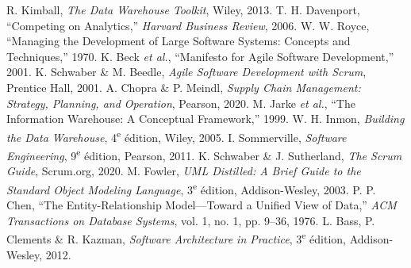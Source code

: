 \documentclass[12pt,a4paper]{report}
\begin{document}
\cleardoublepage
\begin{thebibliography}{99}
    R. Kimball, \textit{The Data Warehouse Toolkit}, Wiley, 2013.  
    T. H. Davenport, “Competing on Analytics,” \textit{Harvard Business Review}, 2006.  
    W. W. Royce, “Managing the Development of Large Software Systems: Concepts and Techniques,” 1970.  
    K. Beck \emph{et al.}, “Manifesto for Agile Software Development,” 2001.  
    K. Schwaber \& M. Beedle, \textit{Agile Software Development with Scrum}, Prentice Hall, 2001.  
    A. Chopra \& P. Meindl, \textit{Supply Chain Management: Strategy, Planning, and Operation}, Pearson, 2020.  
    M. Jarke \emph{et al.}, “The Information Warehouse: A Conceptual Framework,” 1999.  
    W. H. Inmon, \textit{Building the Data Warehouse}, 4\textsuperscript{e} édition, Wiley, 2005.  
    I. Sommerville, \textit{Software Engineering}, 9\textsuperscript{e} édition, Pearson, 2011.
    K. Schwaber \& J. Sutherland, \textit{The Scrum Guide}, Scrum.org, 2020.
    M. Fowler, \textit{UML Distilled: A Brief Guide to the Standard Object Modeling Language}, 3\textsuperscript{e} édition, Addison-Wesley, 2003.
    P. P. Chen, “The Entity-Relationship Model—Toward a Unified View of Data,” \textit{ACM Transactions on Database Systems}, vol. 1, no. 1, pp. 9–36, 1976.
    L. Bass, P. Clements \& R. Kazman, \textit{Software Architecture in Practice}, 3\textsuperscript{e} édition, Addison-Wesley, 2012.
\end{thebibliography}
\end{document}
